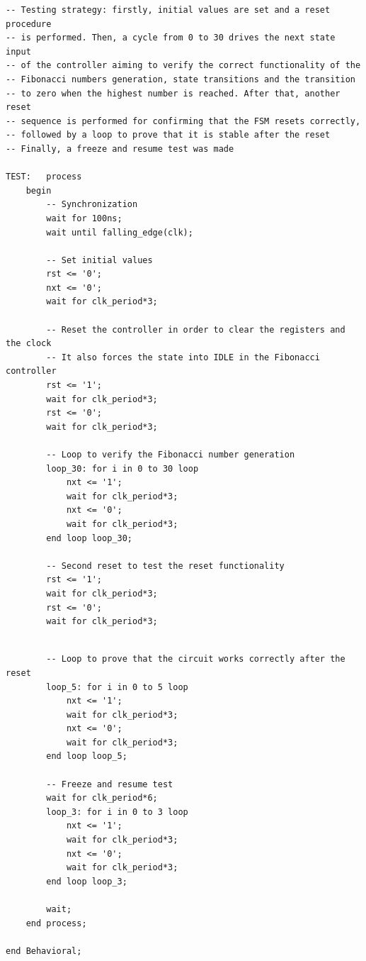 \documentclass[10pt]{article}
\begin{document}
\begin{verbatim}
-- Testing strategy: firstly, initial values are set and a reset procedure
-- is performed. Then, a cycle from 0 to 30 drives the next state input 
-- of the controller aiming to verify the correct functionality of the 
-- Fibonacci numbers generation, state transitions and the transition 
-- to zero when the highest number is reached. After that, another reset 
-- sequence is performed for confirming that the FSM resets correctly, 
-- followed by a loop to prove that it is stable after the reset
-- Finally, a freeze and resume test was made

TEST:   process
    begin
        -- Synchronization
        wait for 100ns;
        wait until falling_edge(clk);
        
        -- Set initial values
        rst <= '0';
        nxt <= '0';
        wait for clk_period*3;
        
        -- Reset the controller in order to clear the registers and the clock 
        -- It also forces the state into IDLE in the Fibonacci controller
        rst <= '1';
        wait for clk_period*3;
        rst <= '0';
        wait for clk_period*3;
        
        -- Loop to verify the Fibonacci number generation
        loop_30: for i in 0 to 30 loop
            nxt <= '1';
            wait for clk_period*3;
            nxt <= '0';
            wait for clk_period*3;
        end loop loop_30;
    
        -- Second reset to test the reset functionality
        rst <= '1';
        wait for clk_period*3;
        rst <= '0';
        wait for clk_period*3;
\end{verbatim}
\newpage
\begin{verbatim}
        
        -- Loop to prove that the circuit works correctly after the reset
        loop_5: for i in 0 to 5 loop
            nxt <= '1';
            wait for clk_period*3;
            nxt <= '0';
            wait for clk_period*3;
        end loop loop_5;
        
        -- Freeze and resume test
        wait for clk_period*6;
        loop_3: for i in 0 to 3 loop
            nxt <= '1';
            wait for clk_period*3;
            nxt <= '0';
            wait for clk_period*3;
        end loop loop_3;
        
        wait;
    end process;

end Behavioral;
\end{verbatim}
\newpage
\end{document}
